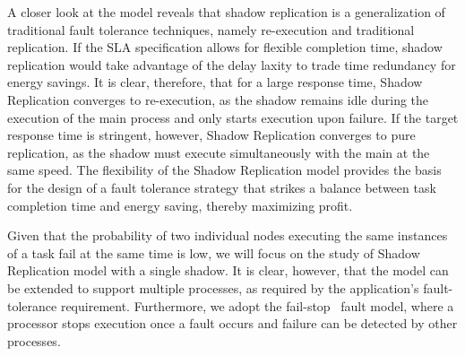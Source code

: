


A closer look at the model reveals that shadow
replication is a generalization of traditional fault tolerance
techniques, namely re-execution and traditional replication. If the
SLA specification allows for flexible completion time, shadow
replication would take advantage of the delay laxity to trade time
redundancy for energy savings. It is clear, therefore, that for a
large response time, Shadow Replication converges to re-execution, as
the shadow remains idle during the execution of the main process and
only starts execution upon failure. If the target response time is
stringent, however, Shadow Replication converges to pure replication,
as the shadow must execute simultaneously with the main at the same
speed. The flexibility of the Shadow Replication model provides the
basis for the design of a fault tolerance strategy that strikes a
balance between task completion time and energy saving, thereby
maximizing profit.

Given that the probability of two individual nodes executing the same
instances of a task fail at the same time is low, we will focus on the study of Shadow Replication model with a single shadow. It is clear, however, that the model can
be extended to support multiple processes, as required by the
application's fault-tolerance requirement. Furthermore, we adopt the
fail-stop~ fault model, where a processor stops execution once a fault
occurs and failure can be detected by other
processes\cite{gartner_faults_1999,cristian_comm_1991}.

